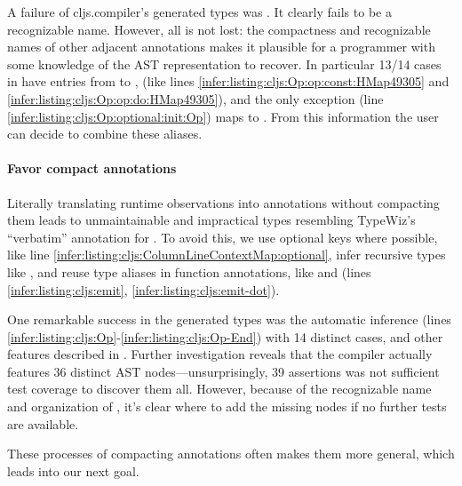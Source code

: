 A failure of cljs.compiler's
generated types was .
It clearly fails to be a recognizable name.
However, all is not lost:
the compactness and recognizable names of other adjacent annotations
makes it plausible for a programmer with some
knowledge of the AST representation to 
recover.
In particular 13/14 cases in 
have entries from  to , 
(like lines \ref{infer:listing:cljs:Op:op:const:HMap49305} and \ref{infer:listing:cljs:Op:op:do:HMap49305}),
and the only exception (line \ref{infer:listing:cljs:Op:optional:init:Op})
maps to . From this information the user can
decide to combine these aliases.




\paragraph{Favor compact annotations}
Literally translating runtime observations into
annotations without compacting them
leads to unmaintainable and impractical types resembling
TypeWiz's ``verbatim'' annotation for .
To avoid this, we
  use optional keys where possible, like line \ref{infer:listing:cljs:ColumnLineContextMap:optional},
  infer recursive types like , and
  reuse type aliases in function annotations, like
     and  (lines \ref{infer:listing:cljs:emit}, \ref{infer:listing:cljs:emit-dot}).

One remarkable success in the generated types
was the automatic inference  (lines \ref{infer:listing:cljs:Op}-\ref{infer:listing:cljs:Op-End})
with 14 distinct cases, and other features described in .
Further investigation reveals that
the compiler actually features 36 distinct AST nodes---unsurprisingly, 39 assertions was not sufficient
test coverage to discover them all.
However, because of the recognizable name and organization of
, it's clear where to add the missing nodes
if no further tests are available.

These processes of compacting annotations often makes them more general,
which leads into our next goal.


